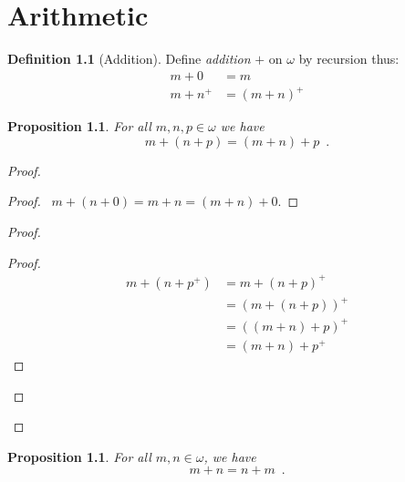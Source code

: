 \documentclass{report}
\let\qed\relax
\newtheorem{prop}[ax]{Proposition}
\theoremstyle{definition}
\newtheorem{df}[ax]{Definition}
\begin{document}
\chapter{Arithmetic}

\begin{df}[Addition]
Define \emph{addition} $+$ on $\omega$ by recursion thus:
\begin{align*}
	m + 0 & = m \\
	m + n^+ & = (m + n)^+
\end{align*}
\end{df}

\begin{prop}
\label{prop:plus_assoc}
For all $m,n,p \in \omega$ we have
\[ m + (n + p) = (m + n) + p \enspace . \]
\end{prop}

\begin{proof}
\pf
{}
\begin{proof}
	\pf\ $m + (n + 0) = m + n = (m + n) + 0$.
\end{proof}
\begin{proof}
	\begin{proof}
		\pf
		\begin{align*}
			m + (n + p^+) & = m + (n + p)^+ \\
			& = (m + (n + p))^+ \\
			& = ((m + n) + p)^+ \\
			& = (m + n) + p^+
		\end{align*}
	\end{proof}
\end{proof}
\qed
\end{proof}

\begin{prop}
\label{prop:plus_comm}
For all $m,n \in \omega$, we have
\[ m + n = n + m \enspace . \]
\end{prop}
\end{document}
